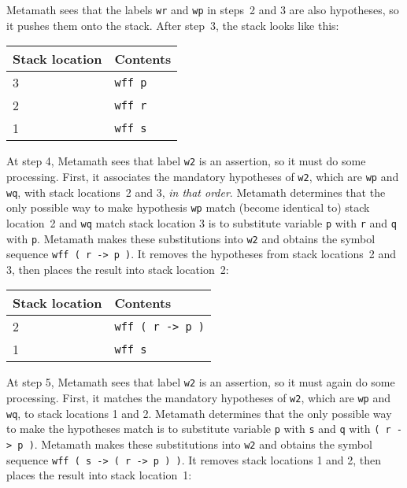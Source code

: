 Metamath sees that the labels \texttt{wr} and \texttt{wp} in steps~2 and 3 are also
hypotheses, so it pushes them onto the stack.  After step~3, the stack looks
like
this:

\begin{center}\begin{tabular}{|l|l|}\hline
{Stack location} & {Contents} \\ \hline \hline
3 & \texttt{wff p} \\ \hline
2 & \texttt{wff r} \\ \hline
1 & \texttt{wff s} \\ \hline
\end{tabular}\end{center}

At step 4, Metamath sees that label \texttt{w2} is an assertion, so it must do
some processing.  First, it associates the mandatory hypotheses of \texttt{w2},
which are \texttt{wp} and \texttt{wq}, with stack locations~2 and 3, {\em in that
order}. Metamath determines that the only possible way
to make hypothesis \texttt{wp} match (become identical to) stack location~2 and
\texttt{wq} match stack location 3 is to substitute variable \texttt{p} with \texttt{r}
and \texttt{q} with \texttt{p}.  Metamath makes these substitutions into \texttt{w2} and
obtains the symbol sequence \texttt{wff ( r -> p )}.  It removes the hypotheses
from stack locations~2 and 3, then places the result into stack location~2:

\begin{center}\begin{tabular}{|l|l|}\hline
{Stack location} & {Contents} \\ \hline \hline
2 & \texttt{wff ( r -> p )} \\ \hline
1 & \texttt{wff s} \\ \hline
\end{tabular}\end{center}

At step 5, Metamath sees that label \texttt{w2} is an assertion, so it must again
do some processing.  First, it matches the mandatory hypotheses of \texttt{w2},
which are \texttt{wp} and \texttt{wq}, to stack locations 1 and 2.
Metamath determines that the only possible way to make the
hypotheses match is to substitute variable \texttt{p} with \texttt{s} and \texttt{q} with
\texttt{( r -> p )}.  Metamath makes these substitutions into \texttt{w2} and obtains
the symbol
sequence \texttt{wff ( s -> ( r -> p ) )}.  It removes stack
locations 1 and 2, then places the result into stack location~1:

